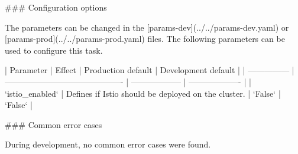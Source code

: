 ### Configuration options

The parameters can be changed in the [params-dev](../../params-dev.yaml) or [params-prod](../../params-prod.yaml) files.
The following parameters can be used to configure this task.

| Parameter       | Effect                                      | Production default | Development default |
| --------------- | ------------------------------------------- | ------------------ | ------------------- |
| `istio_enabled` | Defines if Istio should be deployed on the cluster. | `False`            | `False`             |

### Common error cases

During development, no common error cases were found.
